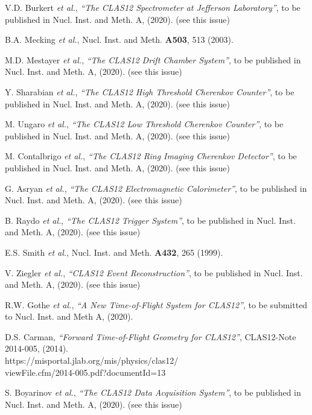 \documentclass[3p,times,twocolumn]{elsarticle}
\begin{document}
\begin{thebibliography}{99}

V.D. Burkert {\it et al.}, {\it ``The CLAS12 Spectrometer at Jefferson Laboratory''}, to be published in
Nucl. Inst. and Meth. A, (2020). (see this issue)
  
B.A. Mecking {\it et al.}, Nucl. Inst. and Meth. {\bf A503}, 513 (2003).

M.D. Mestayer {\it et al.}, {\it ``The CLAS12 Drift Chamber System''}, to be published in Nucl. Inst.
and Meth. A, (2020). (see this issue)

Y. Sharabian {\it et al.}, {\it ``The CLAS12 High Threshold Cherenkov Counter''}, to be published in Nucl. Inst.
and Meth. A, (2020). (see this issue)
  
M. Ungaro {\it et al.}, {\it ``The CLAS12 Low Threshold Cherenkov Counter''}, to be published in Nucl. Inst.
and Meth. A, (2020). (see this issue)
  
M. Contalbrigo {\it et al.}, {\it ``The CLAS12 Ring Imaging Cherenkov Detector''}, to be published in Nucl. Inst.
and Meth. A, (2020). (see this issue)

G. Asryan {\it et al.}, {\it ``The CLAS12 Electromagnetic Calorimeter''}, to be published in Nucl. Inst.
and Meth. A, (2020). (see this issue)

B. Raydo {\it et al.}, {\it ``The CLAS12 Trigger System''}, to be published in Nucl. Inst. and Meth. A, (2020).
(see this issue)
  
E.S. Smith {\it et al.}, Nucl. Inst. and Meth. {\bf A432}, 265 (1999).

V. Ziegler {\it et al.}, {\it ``CLAS12 Event Reconstruction''}, to be published in Nucl. Inst.
and Meth. A, (2020). (see this issue)

R.W. Gothe {\it et al.}, {\it ``A New Time-of-Flight System for CLAS12''}, to be submitted to Nucl. Inst.
and Meth A, (2020).

D.S. Carman, {\it ``Forward Time-of-Flight Geometry for CLAS12''}, CLAS12-Note 2014-005, (2014). \\
https://misportal.jlab.org/mis/physics/clas12/\\ viewFile.cfm/2014-005.pdf?documentId=13

S. Boyarinov {\it et al.}, {\it ``The CLAS12 Data Acquisition System''}, to be published in Nucl. Inst. and
Meth. A, (2020). (see this issue)


\end{thebibliography}
\end{document}
